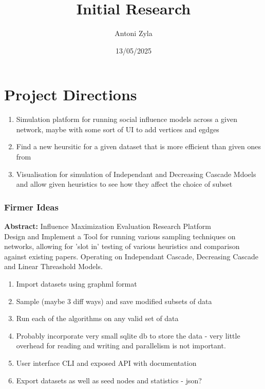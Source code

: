 \documentclass{article}
\title{Initial Research}
\author{Antoni Zyla}
\date{13/05/2025}
\begin{document}
\maketitle

\section{Project Directions}

\begin{enumerate}
  \item Simulation platform for running social influence models across a given network, maybe with some sort of UI to add vertices and egdges
  \item Find a new heursitic for a given dataset that is more efficient than given ones from \cite{franks2014learning}
  \item Visualisation for simulation of Independant and Decreasing Cascade Mdoels and allow given heuristics to see how they affect the choice of subset
\end{enumerate}

\subsubsection{Firmer Ideas}

\textbf{Abstract: } Influence Maximization Evaluation Research Platform \\

Design and Implement a Tool for running various sampling techniques on networks, allowing for 'slot in' testing of various heuristics and comparison against existing papers. Operating on Independant Cascade, Decreasing Cascade and Linear Threashold Models.

\begin{enumerate}
  \item Import datasets using graphml format
  \item Sample (maybe 3 diff ways) and save modified subsets of data 
  \item Run each of the algorithms on any valid set of data 
  \item Probably incorporate very small sqlite db to store the data - very little overhead for reading and writing and parallelism is not important.
  \item User interface CLI and exposed API with documentation 
  \item Export datasets as well as seed nodes and statistics - json?
\end{enumerate}
\end{document}
